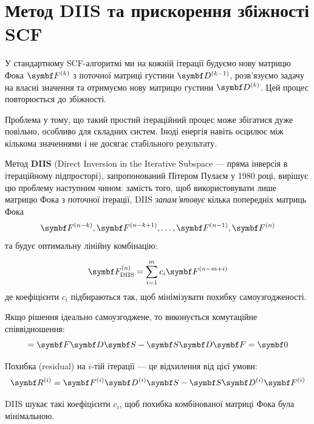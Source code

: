 \section{Метод DIIS та прискорення збіжності SCF}\label{sec:DIIS}

У стандартному SCF-алгоритмі ми на кожній ітерації будуємо нову матрицю Фока $\vect{F}^{(k)}$ з поточної матриці густини $\vect{D}^{(k-1)}$, розв'язуємо задачу на власні значення та отримуємо нову матрицю густини $\vect{D}^{(k)}$. Цей процес повторюється до збіжності.

Проблема у тому, що такий простий ітераційний процес може збігатися дуже повільно, особливо для складних систем. Іноді енергія навіть осцилює між кількома значеннями і не досягає стабільного результату.

Метод \textbf{DIIS} (Direct Inversion in the Iterative Subspace --- пряма інверсія в ітераційному підпросторі), запропонований Пітером Пулаєм у 1980 році, вирішує цю проблему наступним чином: замість того, щоб використовувати лише матрицю Фока з поточної ітерації, DIIS \emph{запам'ятовує} кілька попередніх матриць Фока
\begin{equation*}
	\vect{F}^{(n-k)}, \vect{F}^{(n-k+1)}, \ldots, \vect{F}^{(n-1)}, \vect{F}^{(n)}
\end{equation*}
та будує оптимальну лінійну комбінацію:

\begin{equation}
	\vect{F}_{\text{DIIS}}^{(n)} = \sum_{i=1}^{m} c_i \vect{F}^{(n-m+i)}
\end{equation}
%
де коефіцієнти $c_i$ підбираються так, щоб мінімізувати похибку самоузгодженості.

\begin{commentbox}
	Якщо рішення ідеально самоузгоджене, то виконується комутаційне співвідношення:
	\begin{equation}
		[\vect{F}, \vect{D}\vect{S}] = \vect{F}\vect{D}\vect{S} - \vect{S}\vect{D}\vect{F} = \vect{0}
	\end{equation}

	Похибка (residual) на $i$-тій ітерації --- це відхилення від цієї умови:
	\begin{equation}
		\vect{R}^{(i)} = \vect{F}^{(i)} \vect{D}^{(i)} \vect{S} - \vect{S} \vect{D}^{(i)} \vect{F}^{(i)}
	\end{equation}

	DIIS шукає такі коефіцієнти $c_i$, щоб похибка комбінованої матриці Фока була мінімальною.
\end{commentbox}

